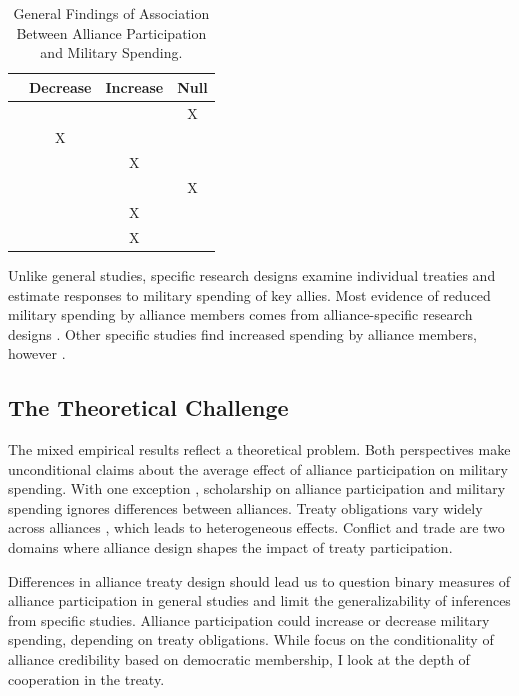 \documentclass[12pt]{article}
\begin{document}
\begin{table}[hbt!]
\begin{center}
\begin{tabular}{lccc}
     & Decrease & Increase & Null \\
\hline
\citet{MostSiverson1987} &  &  & X \\
\citet{Conybeare1994} & X & &  \\
\citet{Diehl1994} &  & X &  \\
\citet{Goldsmith2003} &  &  & X \\
\citet{MorganPalmer2006} &  & X & \\ 
\citet{QuirozFlores2011} &  & X &  \\ 
\hline
\end{tabular}
\caption{General Findings of Association Between Alliance Participation and Military Spending.}
\label{tab:results-sum}
\end{center} 
\end{table}


Unlike general studies, specific research designs examine individual treaties and estimate responses to military spending of key allies. 
Most evidence of reduced military spending by alliance members comes from alliance-specific research designs \citep{BarnettLevy1991, Morrow1993, Sorokin1994, PluemperNeumayer2015, GeorgeSandler2017}.
Other specific studies find increased spending by alliance members, however \citep{ConybeareSandler1990, Chenetal1996}. 


\subsection{The Theoretical Challenge}


The mixed empirical results reflect a theoretical problem. 
Both perspectives make unconditional claims about the average effect of alliance participation on military spending.  
With one exception \citep{DigiuseppePoast2016}, scholarship on alliance participation and military spending ignores differences between alliances.
Treaty obligations vary widely across alliances \citep{Leedsetal2002}, which leads to heterogeneous effects. 
Conflict \citep{Leeds2003, Benson2012} and trade \citep{Long2003, LongLeeds2006} are two domains where alliance design shapes the impact of treaty participation. 


Differences in alliance treaty design should lead us to question binary measures of alliance participation in general studies and limit the generalizability of inferences from specific studies. 
Alliance participation could increase or decrease military spending, depending on treaty obligations. 
While \citet{DigiuseppePoast2016} focus on the conditionality of alliance credibility based on democratic membership, I look at the depth of cooperation in the treaty. 
\end{document}
